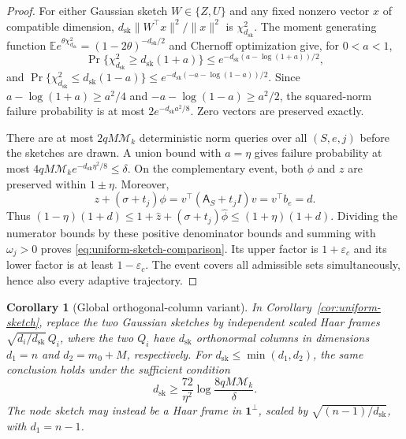 \documentclass[conference]{IEEEtran}
\newtheorem{corollary}{Corollary}
\theoremstyle{definition}
\newcommand{\dsk}{d_{\mathrm{sk}}}
\newcommand{\matA}{\mathsf A}
\begin{document}
\begin{proof}
For either Gaussian sketch $W\in\{Z,U\}$ and any fixed nonzero
vector $x$ of compatible dimension,
${\dsk}\|W^\top x\|^2/\|x\|^2$ is $\chi_{\dsk}^2$.
The moment generating function
$\mathbb E e^{\theta\chi_{\dsk}^2}=(1-2\theta)^{-\dsk/2}$ and Chernoff
optimization give, for $0<a<1$,
\[
\Pr\{\chi_{\dsk}^2\ge {\dsk}(1+a)\}
\le e^{-{\dsk}(a-\log(1+a))/2},
\]
and
$\Pr\{\chi_{\dsk}^2\le {\dsk}(1-a)\}
\le e^{-{\dsk}(-a-\log(1-a))/2}$.
Since
$a-\log(1+a)\ge a^2/4$ and
$-a-\log(1-a)\ge a^2/2$, the squared-norm failure
probability is at most $2e^{-{\dsk}a^2/8}$. Zero vectors are
preserved exactly.

There are at most $2qM\mathcal M_k$ deterministic norm queries over
all $(S,e,j)$ before the sketches are drawn. A union bound
with $a=\eta$ gives failure probability at most
$4qM\mathcal M_ke^{-{\dsk}\eta^2/8}\le\delta$.
On the complementary event, both ${\phi}$ and $z$ are preserved
within $1\pm\eta$.
Moreover,
\[
z+(\sigma+t_j){\phi}
=v^\top({\matA}_S+t_jI)v=v^\top b_e=d.
\]
Thus
$(1-\eta)(1+d)\le1+\widehat z+
(\sigma+t_j)\widehat {\phi}\le(1+\eta)(1+d)$.
Dividing the numerator bounds by these positive denominator
bounds and summing with $\omega_j>0$ proves
\eqref{eq:uniform-sketch-comparison}.
Its upper factor is $1+\varepsilon_c$ and its lower factor
is at least $1-\varepsilon_c$.
The event covers all admissible sets simultaneously, hence also
every adaptive trajectory.
\end{proof}
\begin{corollary}[Global orthogonal-column variant]
\label{cor:uniform-haar}
In Corollary~\ref{cor:uniform-sketch}, replace the two Gaussian sketches by independent scaled Haar frames $\sqrt{d_i/{\dsk}}\,Q_i$, where the two $Q_i$ have ${\dsk}$ orthonormal columns in dimensions $d_1=n$ and $d_2=m_0+M$, respectively.
For ${\dsk}\le\min(d_1,d_2)$, the same conclusion holds under the sufficient condition
\begin{equation}
{\dsk}\ge\frac{72}{\eta^2}\log\frac{8qM\mathcal M_k}{\delta}.
\label{eq:uniform-haar-dimension}
\end{equation}
The node sketch may instead be a Haar frame in $\mathbf1^\perp$, scaled by $\sqrt{(n-1)/{\dsk}}$, with $d_1=n-1$.
\end{corollary}
\end{document}
